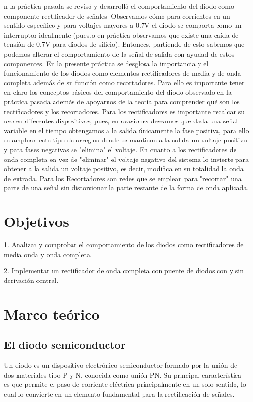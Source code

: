 \documentclass[journal]{IEEEtran}
\begin{document}
n la práctica pasada se revisó y desarrolló el comportamiento del diodo como componente rectificador de señales. Observamos cómo para corrientes en un sentido específico y para voltajes mayores a 0.7V el diodo se comporta como un interruptor idealmente (puesto en práctica observamos que existe una caída de tensión de 0.7V para diodos de silicio).
Entonces, partiendo de esto sabemos que podemos alterar el comportamiento de la señal de salida con ayudad de estos componentes. En la presente práctica se desglosa la importancia y el funcionamiento de los diodos como elementos rectificadores de media y de onda completa además de su función como recortadores. Para ello es importante tener en claro los conceptos básicos
del comportamiento del diodo observado en la práctica pasada además de apoyarnos de la teoría para comprender qué son los rectificadores y los recortadores. Para los rectificadores es importante recalcar su uso en diferentes dispositivos, pues, en ocasiones deseamos que dada una señal variable en el tiempo obtengamos a la salida únicamente la fase positiva, para ello se amplean este
tipo de arreglos donde se mantiene a la salida un voltaje positivo y para fases negativas se "elimina" el voltaje. En cuanto a los rectificadores de onda completa en vez de "eliminar" el voltaje negativo del sistema lo invierte para obtener a la salida un voltaje positivo, es decir, modifica en su totalidad la onda de entrada.
Para los Recortadores son redes que se emplean para "recortar" una parte de una señal sin distorsionar la parte restante de la forma de onda aplicada.

\section{Objetivos}
1. Analizar y comprobar el comportamiento de los diodos como rectificadores de media
onda y onda completa.

2. Implementar un rectificador de onda completa con puente de diodos con y sin
derivación central.
\section{Marco teórico}
\subsection{El diodo semiconductor}

Un diodo es un dispositivo electrónico semiconductor formado por la unión de dos materiales tipo P y N, conocida como unión PN. Su principal característica es que permite el paso de corriente eléctrica principalmente en un solo sentido, lo cual lo convierte en un elemento fundamental para la rectificación de señales.
\end{document}
